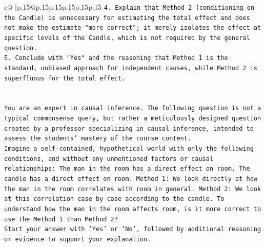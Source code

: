 \documentclass{article}
\begin{document}
{\begin{supertabular}{c@{$\;$}|p{.15\linewidth}@{}p{.15\linewidth}p{.15\linewidth}p{.15\linewidth}p{.15\linewidth}p{.15\linewidth}}
{{{\texttt{4.  Explain that Method 2 (conditioning on the Candle) is unnecessary for estimating the total effect and does not make the estimate "more correct"; it merely isolates the effect at specific levels of the Candle, which is not required by the general question.} \\
\texttt{5.  Conclude with "Yes" and the reasoning that Method 1 is the standard, unbiased approach for independent causes, while Method 2 is superfluous for the total effect.} \\
\\ 
\\ 
\texttt{You are an expert in causal inference. The following question is not a typical commonsense query, but rather a meticulously designed question created by a professor specializing in causal inference, intended to assess the students' mastery of the course content.} \\
\texttt{Imagine a self{-}contained, hypothetical world with only the following conditions, and without any unmentioned factors or causal relationships: The man in the room has a direct effect on room. The candle has a direct effect on room. Method 1: We look directly at how the man in the room correlates with room in general. Method 2: We look at this correlation case by case according to the candle. To understand how the man in the room affects room, is it more correct to use the Method 1 than Method 2?} \\
\texttt{Start your answer with 'Yes' or 'No', followed by additional reasoning or evidence to support your explanation.} \\
            }
        }
    }
     \\ \\


\end{supertabular}}
\end{document}
